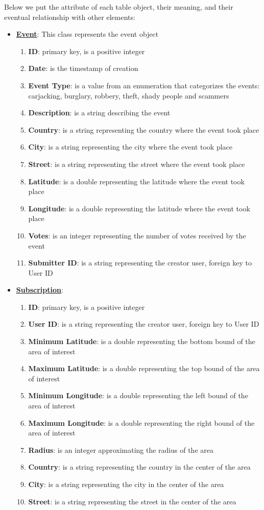 \documentclass[a4paper]{scrreprt}
\begin{document}
\bigskip Below we put the attribute of each table object, their meaning, and their eventual relationship with other elements:
\begin{itemize}
\item \underline{\textbf{Event}}: This class represents the event object
\begin{enumerate}
\item \textbf{ID}: primary key, is a positive integer
\item \textbf{Date}: is the timestamp of creation
\item \textbf{Event Type}: is a value from an enumeration that categorizes the events: carjacking, burglary, robbery, theft, shady people and scammers
\item \textbf{Description}: is a string describing the event
\item \textbf{Country}: is a string representing the country where the event took place
\item \textbf{City}: is a string representing the city where the event took place
\item \textbf{Street}: is a string representing the street where the event took place
\item \textbf{Latitude}: is a double representing the latitude where the event took place
\item \textbf{Longitude}:  is a double representing the latitude where the event took place
\item \textbf{Votes}: is an integer representing the number of votes received by the event
\item \textbf{Submitter ID}: is a string representing the creator user, foreign key to User ID
\end{enumerate}

\item \underline{\textbf{Subscription}}:
\begin{enumerate}
\item \textbf{ID}: primary key, is a positive integer
\item \textbf{User ID}:  is a string representing the creator user, foreign key to User ID
\item \textbf{Minimum Latitude}: is a double representing the bottom bound of the area of interest
\item \textbf{Maximum Latitude}: is a double representing the top bound of the area of interest
\item \textbf{Minimum Longitude}: is a double representing the left bound of the area of interest
\item \textbf{Maximum Longitude}: is a double representing the right bound of the area of interest
\item \textbf{Radius}: is an integer approximating the radius of the area
\item \textbf{Country}: is a string representing the country in the center of the area
\item \textbf{City}:  is a string representing the city in the center of the area
\item \textbf{Street}:  is a string representing the street in the center of the area
\end{enumerate}


\end{itemize}
\end{document}
